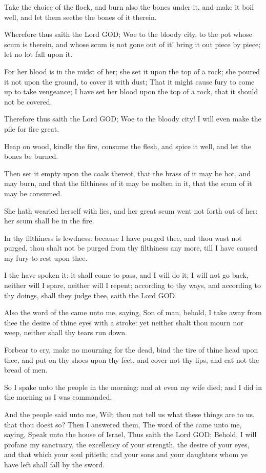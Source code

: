 \verse Take the choice of the flock, and burn also the bones under it, and make it boil well, and let them seethe the bones of it therein.

\verse Wherefore thus saith the Lord GOD; Woe to the bloody city, to the pot whose scum is therein, and whose scum is not gone out of it! bring it out piece by piece; let no lot fall upon it.

\verse For her blood is in the midst of her; she set it upon the top of a rock; she poured it not upon the ground, to cover it with dust; \verse That it might cause fury to come up to take vengeance; I have set her blood upon the top of a rock, that it should not be covered.

\verse Therefore thus saith the Lord GOD; Woe to the bloody city! I will even make the pile for fire great.

\verse Heap on wood, kindle the fire, consume the flesh, and spice it well, and let the bones be burned.

\verse Then set it empty upon the coals thereof, that the brass of it may be hot, and may burn, and that the filthiness of it may be molten in it, that the scum of it may be consumed.

\verse She hath wearied herself with lies, and her great scum went not forth out of her: her scum shall be in the fire.

\verse In thy filthiness is lewdness: because I have purged thee, and thou wast not purged, thou shalt not be purged from thy filthiness any more, till I have caused my fury to rest upon thee.

\verse I the \LORD have spoken it: it shall come to pass, and I will do it; I will not go back, neither will I spare, neither will I repent; according to thy ways, and according to thy doings, shall they judge thee, saith the Lord GOD.

\verse Also the word of the \LORD came unto me, saying, \verse Son of man, behold, I take away from thee the desire of thine eyes with a stroke: yet neither shalt thou mourn nor weep, neither shall thy tears run down.

\verse Forbear to cry, make no mourning for the dead, bind the tire of thine head upon thee, and put on thy shoes upon thy feet, and cover not thy lips, and eat not the bread of men.

\verse So I spake unto the people in the morning: and at even my wife died; and I did in the morning as I was commanded.

\verse And the people said unto me, Wilt thou not tell us what these things are to us, that thou doest so?  \verse Then I answered them, The word of the \LORD came unto me, saying, \verse Speak unto the house of Israel, Thus saith the Lord GOD; Behold, I will profane my sanctuary, the excellency of your strength, the desire of your eyes, and that which your soul pitieth; and your sons and your daughters whom ye have left shall fall by the sword.


